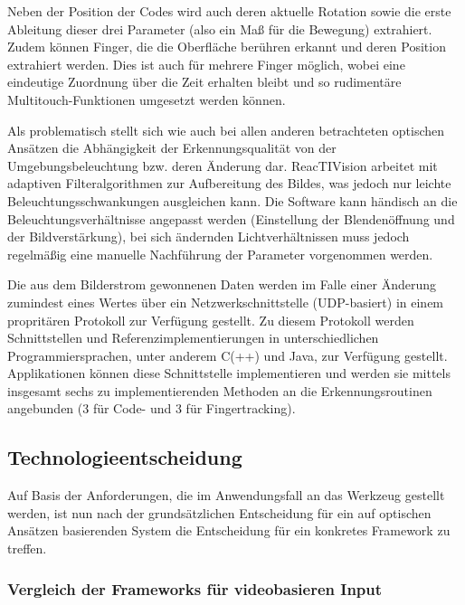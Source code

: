 Neben der Position der Codes wird auch deren aktuelle Rotation sowie die erste Ableitung dieser drei Parameter (also ein Maß für die Bewegung) extrahiert. Zudem können Finger, die die Oberfläche berühren erkannt und deren Position extrahiert werden. Dies ist auch für mehrere Finger möglich, wobei eine eindeutige Zuordnung über die Zeit erhalten bleibt und so rudimentäre Multitouch-Funktionen umgesetzt werden können.

Als problematisch stellt sich wie auch bei allen anderen betrachteten optischen Ansätzen die Abhängigkeit der Erkennungsqualität von der Umgebungsbeleuchtung bzw. deren Änderung dar. ReacTIVision arbeitet mit adaptiven Filteralgorithmen zur Aufbereitung des Bildes, was jedoch nur leichte Beleuchtungsschwankungen ausgleichen kann. Die Software kann händisch an die Beleuchtungsverhältnisse angepasst werden (Einstellung der Blendenöffnung und der Bildverstärkung), bei sich ändernden Lichtverhältnissen muss jedoch regelmäßig eine manuelle Nachführung der Parameter vorgenommen werden.

Die aus dem Bilderstrom gewonnenen Daten werden im Falle einer Änderung zumindest eines Wertes über ein Netzwerkschnittstelle (UDP-basiert) in einem propritären Protokoll zur Verfügung gestellt. Zu diesem Protokoll werden Schnittstellen und Referenzimplementierungen in unterschiedlichen Programmiersprachen, unter anderem C(++) und Java, zur Verfügung gestellt. Applikationen können diese Schnittstelle implementieren und werden sie mittels insgesamt sechs zu implementierenden Methoden an die Erkennungsroutinen angebunden (3 für Code- und 3 für Fingertracking).




\subsection{Technologieentscheidung} %
\label{sub:technologieentscheidung}

Auf Basis der Anforderungen, die im Anwendungsfall an das Werkzeug gestellt werden, ist nun nach der grundsätzlichen Entscheidung für ein auf optischen Ansätzen basierenden System die Entscheidung für ein konkretes Framework zu treffen. 

\subsubsection{Vergleich der Frameworks für videobasieren Input}\label{subs:vergleich_video_frameworks}

